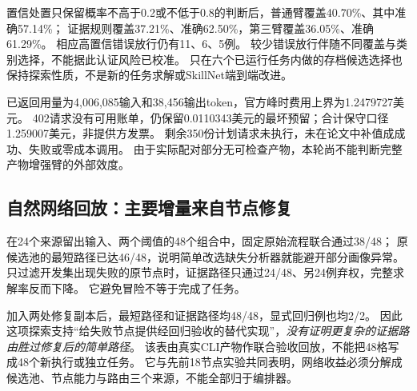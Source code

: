 置信处置只保留概率不高于0.2或不低于0.8的判断后，普通臂覆盖40.70\%、其中准确57.14\%；
证据规则覆盖37.21\%、准确62.50\%，第三臂覆盖36.05\%、准确61.29\%。
相应高置信错误放行仍有11、6、5例。
较少错误放行伴随不同覆盖与类别选择，不能据此认证风险已校准。
只在六个已运行任务内做的存档候选选择也保持探索性质，不是新的任务求解或SkillNet端到端改进。

已返回用量为4,006,085输入和38,456输出token，官方峰时费用上界为1.2479727美元。
402请求没有可用账单，仍保留0.0110343美元的最坏预留；合计保守口径1.259007美元，非提供方发票。
剩余350份计划请求未执行，未在论文中补值成成功、失败或零成本调用。
由于实际配对部分无可检查产物，本轮尚不能判断完整产物增强臂的外部效度。

\subsection{自然网络回放：主要增量来自节点修复}

在24个来源留出输入、两个阈值的48个组合中，固定原始流程联合通过38/48；
原候选池的最短路径已达46/48，说明简单改选缺失分析器就能避开部分画像异常。
只过滤开发集出现失败的原节点时，证据路径只通过24/48、另24例弃权，完整求解率反而下降。
它避免冒险不等于完成了任务。

加入两处修复副本后，最短路径和证据路径均48/48，显式回归例也均2/2。
因此这项探索支持“给失败节点提供经回归验收的替代实现”，\emph{没有证明更复杂的证据路由胜过修复后的简单路径}。
该表由真实CLI产物作联合验收回放，不能把48格写成48个新执行或独立任务。
它与先前18节点实验共同表明，网络收益必须分解成候选池、节点能力与路由三个来源，不能全部归于编排器。
